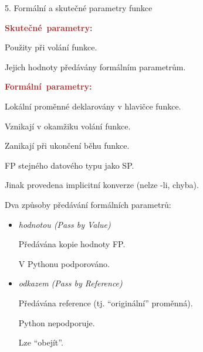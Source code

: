 \documentclass[czech]{beamer}
\begin{document}
\begin{frame}{5. Formální a skutečné parametry funkce}

{\footnotesize\textbf{\textcolor{brown}{Skutečné~parametry:}}}{\footnotesize\par}

{\footnotesize Použity při volání funkce.}{\footnotesize\par}

{\footnotesize Jejich hodnoty předávány formálním parametrům.}{\footnotesize\par}

{\footnotesize\bigskip{}
}{\footnotesize\par}

{\footnotesize\textbf{\textcolor{brown}{Formální~parametry:}}}{\footnotesize\par}

{\footnotesize Lokální proměnné deklarovány v hlavičce funkce.}{\footnotesize\par}

{\footnotesize Vznikají v okamžiku volání funkce.}{\footnotesize\par}

{\footnotesize Zanikají při ukončení běhu funkce.\medskip{}
}{\footnotesize\par}

{\footnotesize FP stejného datového typu jako SP. }{\footnotesize\par}

{\footnotesize Jinak provedena implicitní konverze (nelze -li, chyba).}{\footnotesize\par}

{\footnotesize\bigskip{}
}{\footnotesize\par}

{\footnotesize Dva způsoby předávání formálních parametrů:}{\footnotesize\par}
\begin{itemize}
\item {\footnotesize\emph{hodnotou (Pass by Value)}}{\footnotesize\par}

{\footnotesize Předávána kopie hodnoty FP.}{\footnotesize\par}

{\footnotesize V Pythonu podporováno.}{\footnotesize\par}
\item {\footnotesize\emph{odkazem (Pass by Reference)}}{\footnotesize\par}

{\footnotesize Předávána reference (tj. ``originální'' proměnná).}{\footnotesize\par}

{\footnotesize Python nepodporuje.}{\footnotesize\par}

{\footnotesize Lze ``obejít''.}{\footnotesize\par}
\end{itemize}
\end{frame}
\end{document}
